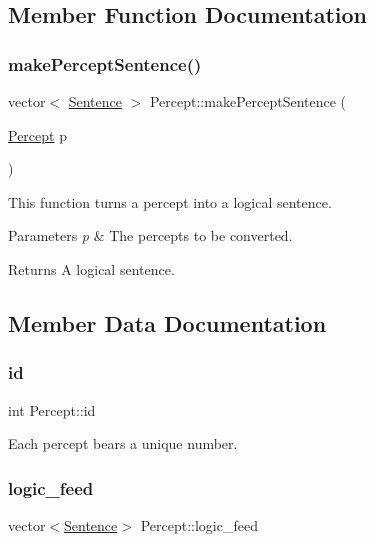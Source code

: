 \subsection{Member Function Documentation}
\mbox{\label{classPercept_a3912d5efafea356d07436b791a97684c}} 
\subsubsection{\texorpdfstring{make\+Percept\+Sentence()}{makePerceptSentence()}}
{\footnotesize\ttfamily vector$<$ \mbox{\hyperlink{classSentence}{Sentence}} $>$ Percept\+::make\+Percept\+Sentence (\begin{DoxyParamCaption}\item[{\mbox{\hyperlink{classPercept}{Percept}}}]{p }\end{DoxyParamCaption})}



This function turns a percept into a logical sentence. 


\begin{DoxyParams}{Parameters}
{\em p} & The percepts to be converted. \\
\hline
\end{DoxyParams}
\begin{DoxyReturn}{Returns}
A logical sentence. 
\end{DoxyReturn}


\subsection{Member Data Documentation}
\mbox{\label{classPercept_a87baa8b4903f43f03a86430185a36840}} 
\subsubsection{\texorpdfstring{id}{id}}
{\footnotesize\ttfamily int Percept\+::id}

Each percept bears a unique number. \mbox{\label{classPercept_a4b92db8d220627cd58a61eb8f6d1faa6}} 
\subsubsection{\texorpdfstring{logic\+\_\+feed}{logic\_feed}}
{\footnotesize\ttfamily vector$<$\mbox{\hyperlink{classSentence}{Sentence}}$>$ Percept\+::logic\+\_\+feed\hspace{0.3cm}{\ttfamily [private]}}

